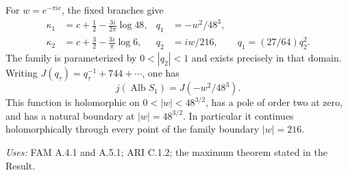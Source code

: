 \begin{proposition}\label{ari:C.2.1}
For $w=e^{-\pi ic}$, the fixed branches give
\begin{align*}
 \kappa_1&=c+\tfrac12-\frac{3i}{2\pi}\log48,&
 q_1&=-w^2/48^3,\\
 \kappa_2&=c+\tfrac32-\frac{3i}{\pi}\log6,&
 q_2&=iw/216,\qquad q_1=(27/64)q_2^2.
\end{align*}
The family is parameterized by $0<|q_2|<1$ and exists precisely in
that domain. Writing $J(q_\tau)=q_\tau^{-1}+744+\cdots$, one has
\[
 j(\operatorname{Alb}S_1)=J(-w^2/48^3).
\]
This function is holomorphic on $0<|w|<48^{3/2}$, has a pole of order
two at zero, and has a natural boundary at $|w|=48^{3/2}$.
In particular it continues holomorphically through every point of the
family boundary $|w|=216$.
\end{proposition}
\noindent\textit{Uses:} FAM A.4.1 and A.5.1; ARI C.1.2; the maximum theorem stated in the Result.\par
